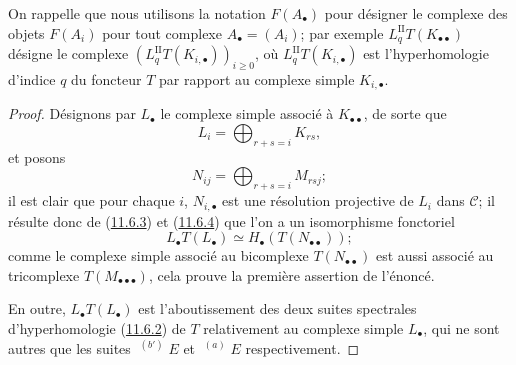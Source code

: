 On rappelle que nous utilisons la notation $F(A_\bullet)$ pour désigner le
complexe des objets $F(A_i)$ pour tout complexe $A_\bullet=(A_i)$; par
exemple $L_q^{\mathrm{II}}T(K_{\bullet\bullet})$ désigne le complexe
$(L_q^{\mathrm{II}}T(K_{i,\bullet}))_{i\geq0}$, où
$L_q^{\mathrm{II}}T(K_{i,\bullet})$ est l'hyperhomologie d'indice $q$ du
foncteur $T$ par rapport au complexe simple $K_{i,\bullet}$.

\begin{proof}
Désignons par $L_\bullet$ le complexe simple associé à
$K_{\bullet\bullet}$, de sorte que
\[
L_i=\bigoplus_{r+s=i}K_{rs},
\]
et posons
\[
N_{ij}=\bigoplus_{r+s=i}M_{rsj};
\]
il est clair que pour chaque $i$, $N_{i,\bullet}$ est une résolution
projective de $L_i$ dans $\mathcal C$; il résulte donc de
(\hyperref[0.11.6.3-fr]{11.6.3}) et
(\hyperref[0.11.6.4-fr]{11.6.4}) que l'on a un isomorphisme fonctoriel
\[
L_\bullet T(L_\bullet)\simeq H_\bullet(T(N_{\bullet\bullet}));
\]
comme le complexe simple associé au bicomplexe $T(N_{\bullet\bullet})$ est
aussi associé au tricomplexe $T(M_{\bullet\bullet\bullet})$, cela prouve la
première assertion de l'énoncé.

En outre, $L_\bullet T(L_\bullet)$ est l'aboutissement des deux suites
spectrales d'hyperhomologie (\hyperref[0.11.6.2-fr]{11.6.2}) de $T$
relativement au complexe simple $L_\bullet$, qui ne sont autres que les suites
$\mathop{}^{(b')}E$ et $\mathop{}^{(a)}E$ respectivement.


\end{proof}
